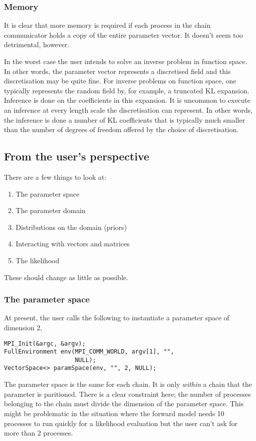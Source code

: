 \documentclass{article}
\begin{document}
\subsubsection{Memory}

It is clear that more memory is required if each process in the chain
communicator holds a copy of the entire parameter vector.  It doesn't seem too
detrimental, however.

In the worst case the user intends to solve an inverse problem in function
space.  In other words, the parameter vector represents a discretised field and
this discretisation may be quite fine.  For inverse problems on function space,
one typically represents the random field by, for example, a truncated KL
expansion.  Inference is done on the coefficients in this expansion.  It is
uncommon to execute an inference at every length scale the discretisation can
represent.  In other words, the inference is done a number of KL coefficients
that is typically much smaller than the number of degrees of freedom offered
by the choice of discretisation.

\subsection{From the user's perspective}

There are a few things to look at:
\begin{enumerate}
  \item The parameter space
  \item The parameter domain
  \item Distributions on the domain (priors)
  \item Interacting with vectors and matrices
  \item The likelihood
\end{enumerate}
These should change as little as possible.

\subsubsection{The parameter space}

At present, the user calls the following to instantiate a parameter space of
dimension 2,
\begin{lstlisting}
MPI_Init(&argc, &argv);
FullEnvironment env(MPI_COMM_WORLD, argv[1], "",
                    NULL);
VectorSpace<> paramSpace(env, "", 2, NULL);
\end{lstlisting}
The parameter space is the same for each chain.  It is only \emph{within} a
chain that the parameter is paritioned.  There is a clear constraint here; the
number of processes belonging to the chain must divide the dimension of the
parameter space.  This might be problematic in the situation where the forward
model needs 10 processes to run quickly for a likelihood evaluation but the
user can't ask for more than 2 processes.
\end{document}
